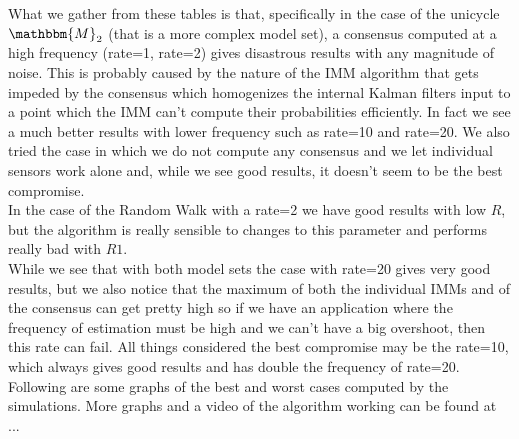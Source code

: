 \documentclass[twocolumn]{article}
\begin{document}
What we gather from these tables is that, specifically in the case of the unicycle $\mathbbm{M}_{2}$ (that is a more complex model set), 
a consensus computed at a high frequency (rate=1, rate=2) gives disastrous results with any magnitude of noise. This is probably caused by 
the nature of the IMM algorithm that gets impeded by the consensus which homogenizes the internal Kalman filters input to a point which 
the IMM can't compute their probabilities efficiently. In fact we see a much better results with lower frequency such as rate=10 and rate=20.
We also tried the case in which we do not compute any consensus and we let individual sensors work alone and, while we see good results, 
it doesn't seem to be the best compromise.
\\
In the case of the Random Walk with a rate=2 we have good results with low $R$, but the algorithm is really sensible to changes to this 
parameter and performs really bad with $R1$.
\\
While we see that with both model sets the case with rate=20 gives very good results, but we also notice that the maximum of both the individual 
IMMs and of the consensus can get pretty high so if we have an application where the frequency of estimation must be high and we can't 
have a big overshoot, then this rate can fail.
All things considered the best compromise may be the rate=10, which always gives good results and has double the frequency of rate=20.
\\
Following are some graphs of the best and worst cases computed by the simulations. More graphs and a video of the algorithm working can 
be found at ... 
\end{document}
